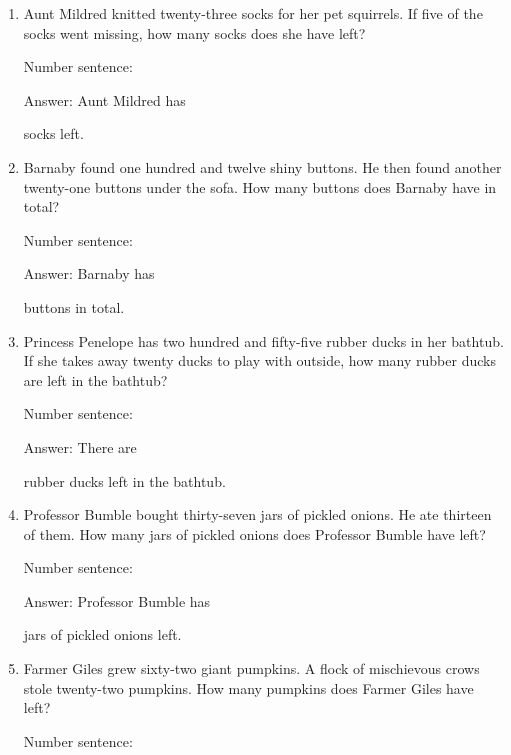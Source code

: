 \documentclass{tufte-book}
\begin{document}
\begin{enumerate}

\item
  Aunt Mildred knitted twenty-three socks for her pet squirrels. If five
  of the socks went missing, how many socks does she have left?\medskip\par
  Number sentence:
  \dotfill\medskip\par
  Answer: Aunt Mildred has
  \dotfill\medskip\par\mbox{}\dotfill\medskip\par\mbox{}\dotfill\bigskip
  socks left.
\item
  Barnaby found one hundred and twelve shiny buttons. He then found
  another twenty-one buttons under the sofa. How many buttons does
  Barnaby have in total?\medskip\par
  Number sentence:
  \dotfill\medskip\par
  Answer: Barnaby has
  \dotfill\medskip\par\mbox{}\dotfill\medskip\par\mbox{}\dotfill\bigskip
  buttons in total.
\item
  Princess Penelope has two hundred and fifty-five rubber ducks in her
  bathtub. If she takes away twenty ducks to play with outside, how many
  rubber ducks are left in the bathtub?\medskip\par
  Number sentence:
  \dotfill\medskip\par
  Answer: There are
  \dotfill\medskip\par\mbox{}\dotfill\medskip\par\mbox{}\dotfill\bigskip
  rubber ducks left in the bathtub.
\item
  Professor Bumble bought thirty-seven jars of pickled onions. He ate
  thirteen of them. How many jars of pickled onions does Professor
  Bumble have left?\medskip\par
  Number sentence:
  \dotfill\medskip\par
  Answer: Professor Bumble has
  \dotfill\medskip\par\mbox{}\dotfill\medskip\par\mbox{}\dotfill\bigskip
  jars of pickled onions left.
\item
  Farmer Giles grew sixty-two giant pumpkins. A flock of mischievous
  crows stole twenty-two pumpkins. How many pumpkins does Farmer Giles
  have left?\medskip\par
  Number sentence:
  \dotfill\medskip\par

\end{enumerate}
\end{document}
